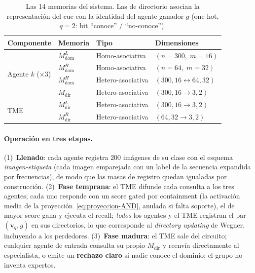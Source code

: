 \documentclass[11pt]{article}
\begin{document}
\begin{table}[H]
\centering
\caption{Las 14 memorias del sistema. Las de directorio asocian la
representación del cue con la identidad del agente ganador $g$ (one-hot,
$q{=}2$: bit ``conoce'' / ``no-conoce'').}
\label{tab:memorias}
\small
\begin{tabular}{@{}llll@{}}
\toprule
\textbf{Componente} & \textbf{Memoria} & \textbf{Tipo} & \textbf{Dimensiones} \\
\midrule
\multirow{4}{*}{Agente $k$ (×3)} &
  $M^L_{\mathrm{dom}}$ & Homo-asociativa & $(n{=}300,\; m{=}16)$ \\
& $M^R_{\mathrm{dom}}$ & Homo-asociativa & $(n{=}64,\; m{=}32)$ \\
& $M^H_{\mathrm{dom}}$ & Hetero-asociativa & $(300, 16 \leftrightarrow 64, 32)$ \\
& $M_{\mathrm{dir}}$   & Hetero-asociativa & $(300, 16 \to 3, 2)$ \\
\midrule
\multirow{2}{*}{TME} &
  $M^L_{\mathrm{dir}}$ & Hetero-asociativa & $(300, 16 \to 3, 2)$ \\
& $M^R_{\mathrm{dir}}$ & Hetero-asociativa & $(64, 32 \to 3, 2)$ \\
\bottomrule
\end{tabular}
\end{table}

\paragraph{Operación en tres etapas.}
(1)~\textbf{Llenado}: cada agente registra 200 imágenes de su clase con el
esquema \emph{imagen-etiqueta} (cada imagen emparejada con un label de la secuencia
expandida por frecuencias), de modo que las masas de registro quedan igualadas
por construcción.
(2)~\textbf{Fase temprana}: el TME difunde cada consulta a los tres agentes;
cada uno responde con un score gated por containment (la activación media de la
proyección~\eqref{eq:proyeccion-AND}, anulada si falta soporte), el de mayor
score gana y ejecuta el recall; \emph{todos} los agentes y el TME registran el
par $(\mathbf{v}_q, g)$ en sus directorios, lo que corresponde al
\textit{directory updating} de Wegner, incluyendo a los perdedores.
(3)~\textbf{Fase madura}: el TME sale del circuito; cualquier agente de entrada
consulta su propio $M_{\mathrm{dir}}$ y reenvía directamente al especialista, o
emite un \textbf{rechazo claro} si nadie conoce el dominio: el grupo no inventa
expertos.
\end{document}
